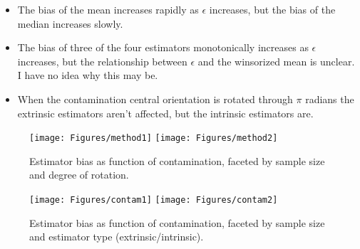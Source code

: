 \documentclass{article}\usepackage[]{graphicx}\usepackage[]{color}
\newenvironment{knitrout}{}{} %
\begin{document}
\begin{itemize}
\item The bias of the mean increases rapidly as $\epsilon$ increases, but the bias of the median increases slowly.
\item The bias of three of the four estimators monotonically increases as $\epsilon$ increases, but the relationship between $\epsilon$ and the winsorized mean is unclear.  I have no idea why this may be.
\item When the contamination central orientation is rotated through $\pi$ radians the extrinsic estimators aren't affected, but the intrinsic estimators are.
\end{itemize}
\begin{knitrout}
\color{fgcolor}\begin{figure}[h]


{\centering \texttt{[image: Figures/method1]} 
\texttt{[image: Figures/method2]} 

}

\caption[Estimator bias as  function of contamination, faceted by sample size and degree of rotation]{Estimator bias as  function of contamination, faceted by sample size and degree of rotation.\label{fig:method}}
\end{figure}


\end{knitrout}


\begin{knitrout}
\color{fgcolor}\begin{figure}[]


{\centering \texttt{[image: Figures/contam1]} 
\texttt{[image: Figures/contam2]} 

}

\caption[Estimator bias as  function of contamination, faceted by sample size and estimator type (extrinsic/intrinsic)]{Estimator bias as  function of contamination, faceted by sample size and estimator type (extrinsic/intrinsic).\label{fig:contam}}
\end{figure}


\end{knitrout}
\end{document}
